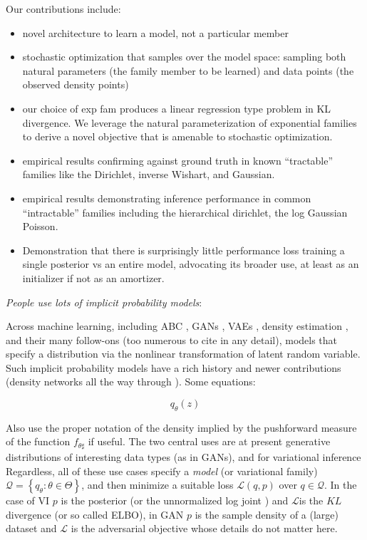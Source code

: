 \documentclass{article}
\begin{document}
Our contributions include:
\begin{itemize}
\item novel architecture to learn a model, not a particular member
\item stochastic optimization that samples over the model space: sampling both natural parameters (the family member to be learned) and data points (the observed density points)
\item our choice of exp fam produces a linear regression type problem in KL divergence.   
 We leverage the natural parameterization of exponential families to derive a novel objective that is amenable to stochastic optimization.
\item empirical results confirming against ground truth in known ``tractable'' families like the Dirichlet, inverse Wishart, and Gaussian.
\item empirical results demonstrating inference performance in common ``intractable'' families including the hierarchical dirichlet, the log Gaussian Poisson.
\item Demonstration that there is surprisingly little performance loss training a single posterior vs an entire model, advocating its broader use, at least as an initializer if not as an amortizer. 
\end{itemize}


  

  \emph{People use lots of implicit probability models}:
  
  Across machine learning, including ABC \cite{gutmann2014statistical} , GANs \cite{Goodfellow:2014aa}, VAEs \cite{Kingma:2013aa, rezende2014stochastic}, density estimation \cite{papamakarios2017masked}, and their many follow-ons (too numerous to cite in any detail), models that specify a distribution via the nonlinear transformation of latent random variable.  Such implicit probability models have a rich history and newer contributions (density networks all the way through \cite{Mohamed:2016aa}).  Some equations:

   $$  q_\theta (z) $$
   
 Also use the proper notation of the density implied by the pushforward measure of the function $f_{\theta\sharp}$ if useful.   The two central uses are at present generative distributions of interesting data types (as in GANs), and for variational inference
 Regardless, all of these use cases specify a \emph{model} (or variational family) $\mathcal{Q} = \left\{ q_\theta : \theta \in \Theta\right\}$, and then minimize a suitable loss $\mathcal{L}( q , p)$ over $q \in \mathcal{Q}$.   In the case of VI $p$ is the posterior (or the unnormalized log joint ) and $\mathcal{L}$is the $KL$ divergence (or so called ELBO), in GAN $p$ is the sample density of a (large) dataset and $\mathcal{L}$ is the adversarial objective whose details do not matter here.
 
\end{document}
